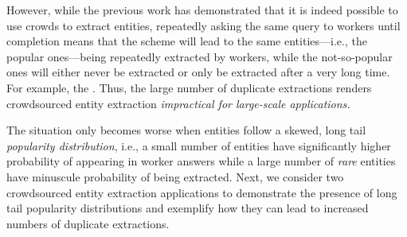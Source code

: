 However, while the previous work has demonstrated that it is indeed possible
to use crowds to extract entities, repeatedly asking the same query to 
workers until completion means that the scheme will lead to 
the same entities---i.e., the popular ones---being repeatedly extracted
by workers, while the not-so-popular ones will either never be extracted
or only be extracted after a very long time. 
For example, the .
Thus, the large number of duplicate extractions renders crowdsourced
entity extraction {\em impractical for large-scale applications.}




The situation only becomes worse when entities follow a skewed, long tail {\em popularity distribution}, i.e., a small number of entities have significantly higher probability of appearing in worker answers while a large number of {\em rare} entities have minuscule probability of being extracted. Next, we consider two crowdsourced entity extraction applications to demonstrate the presence of long tail popularity distributions and exemplify how they can lead to increased numbers of duplicate extractions.

